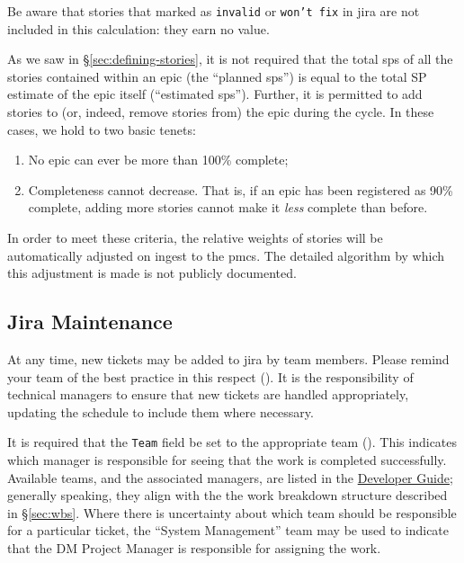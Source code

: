 Be aware that stories that marked as \texttt{invalid} or \texttt{won't fix} in \gls{jira} are not included in this calculation: they earn no value.

As we saw in \S\ref{sec:defining-stories}, it is not required that the total \glspl{sp} of all the stories contained within an \gls{epic} (the ``planned \glspl{sp}'') is equal to the total SP estimate of the \gls{epic} itself (``estimated \glspl{sp}''). Further, it is permitted to add stories to (or, indeed, remove stories from) the \gls{epic} during the \gls{cycle}. In these cases, we hold to two basic tenets:

\begin{enumerate}
\item
  No \gls{epic} can ever be more than 100\% complete;
\item
  Completeness cannot decrease.
  That is, if an \gls{epic} has been registered as 90\% complete, adding more stories cannot make it \emph{less} complete than before.
\end{enumerate}

In order to meet these criteria, the relative weights of stories will be automatically adjusted on ingest to the \gls{pmcs}.
The detailed algorithm by which this adjustment is made is not publicly documented.

\subsection{Jira Maintenance}
\label{sec:jira-maintenance}

At any time, new tickets may be added to \gls{jira} by team members.
Please remind your team of the best practice in this respect ().
It is the responsibility of technical managers to ensure that new tickets are handled appropriately, updating the schedule to include them where necessary.

It is required that the \texttt{Team} field be set to the appropriate team ().
This indicates which manager is responsible for seeing that the work is completed successfully.
Available teams, and the associated managers, are listed in the \href{https://developer.lsst.io/processes/jira_agile.html}{Developer Guide}; generally speaking, they align with the the work breakdown structure described in \S\ref{sec:wbs}.
Where there is uncertainty about which team should be responsible for a particular ticket, the “System Management” team may be used to indicate that the DM Project Manager is responsible for assigning the work.

